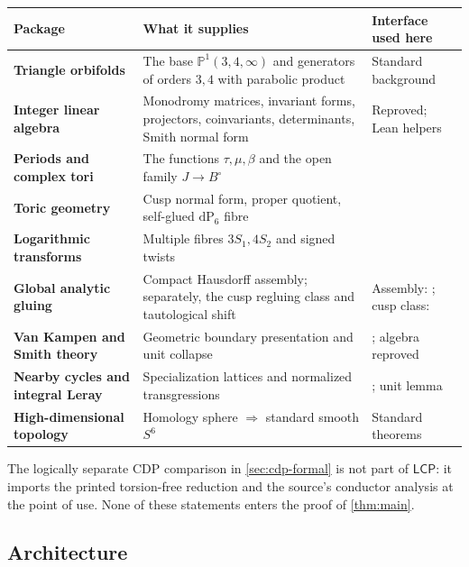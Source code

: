 \documentclass[11pt,reqno]{amsart}
\numberwithin{equation}{section}
\newcommand{\Pone}{\mathbb P^1}
\newcommand{\dP}{\mathrm{dP}_6}
\newcommand{\LCP}{\mathsf{LCP}}
\theoremstyle{definition}
\begin{document}
\begin{center}
\footnotesize
\setlength{\tabcolsep}{4pt}
\renewcommand{\arraystretch}{0.96}
\begin{tabularx}{\textwidth}{@{}>{\raggedright\arraybackslash\bfseries}p{}X>{\raggedright\arraybackslash}p{}@{}}
\toprule
Package & What it supplies & Interface used here\\
\midrule
Triangle orbifolds & The base $\Pone(3,4,\infty)$ and generators of orders $3,4$ with parabolic product & Standard background\\
Integer linear algebra & Monodromy matrices, invariant forms, projectors, coinvariants, determinants, Smith normal form & Reproved; Lean helpers\\
Periods and complex tori & The functions $\tau,\mu,\beta$ and the open family $J\to B^\circ$ & \cite[Thm.~3.4]{S6}\\
Toric geometry & Cusp normal form, proper quotient, self-glued $\dP$ fibre & \cite[Prop.~3.21, Thm.~4.5, Props.~4.6--4.7]{S6}\\
Logarithmic transforms & Multiple fibres $3S_1,4S_2$ and signed twists & \cite[Def.~5.3, Thm.~5.4, Lem.~7.16]{S6}\\
Global analytic gluing & Compact Hausdorff assembly; separately, the cusp regluing class and tautological shift & Assembly: \cite[Thm.~6.2, Prop.~6.3]{S6}; cusp class: \cite[Def.~6.6, Prop.~6.7, \S7.5]{S6}\\
Van Kampen and Smith theory & Geometric boundary presentation and unit collapse & \cite[Thm.~7.17]{S6}; algebra reproved\\
Nearby cycles and integral Leray & Specialization lattices and normalized transgressions & \cite[Props.~7.26--7.27]{S6}; unit lemma\\
High-dimensional topology & Homology sphere $\Rightarrow$ standard smooth $S^6$ & Standard theorems\\
\bottomrule
\end{tabularx}
\end{center}

The logically separate CDP comparison in \cref{sec:cdp-formal} is not part of $\LCP$: it imports the printed torsion-free reduction \cite[p.~692]{CDP20} and the source's conductor analysis \cite[Lem.~10.3, Thm.~10.5, \S10.4]{S6} at the point of use. None of these statements enters the proof of \cref{thm:main}.

\subsection{Architecture}
\end{document}
